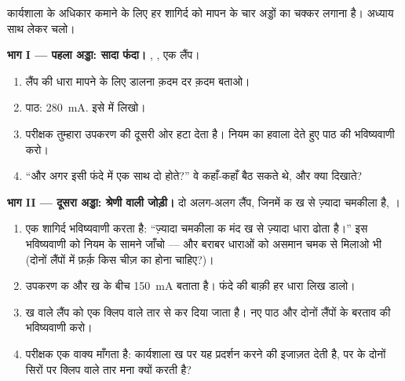 \begin{problem}[{सप्ताहांत समस्या --- इलेक्ट्रॉनिकी कार्यशाला में
योग्यता का दिन; चार अड्डे, हर एक पर एक ऐमीटर; शागिर्द का
लाइसेंस}]\label{pb:g8:intensity-ammeter:1}
कार्यशाला के अधिकार कमाने के लिए हर शागिर्द को मापन के चार अड्डों का
चक्कर लगाना है। अध्याय साथ लेकर चलो।

\medskip\noindent\textbf{भाग I --- पहला अड्डा: सादा फंदा।}
, , एक लैंप।
\begin{enumerate}
  \item लैंप की धारा मापने के लिए  डालना क़दम दर क़दम बताओ।
  \item पाठ: \qty{280}{mA}. इसे  में लिखो।
  \item परीक्षक तुम्हारा उपकरण  की दूसरी ओर हटा देता है। नियम का
        हवाला देते हुए पाठ की भविष्यवाणी करो।
  \item ``और अगर इसी फंदे में एक साथ दो  होते?'' वे कहाँ-कहाँ
        बैठ सकते थे, और क्या दिखाते?
\end{enumerate}

\medskip\noindent\textbf{भाग II --- दूसरा अड्डा: श्रेणी वाली जोड़ी।}
दो अलग-अलग लैंप, जिनमें क ख से ज़्यादा चमकीला है, ।
\begin{enumerate}[resume]
  \item एक शागिर्द भविष्यवाणी करता है: ``ज़्यादा चमकीला क मंद ख से
        ज़्यादा धारा ढोता है।'' इस भविष्यवाणी को नियम के सामने जाँचो
        --- और बराबर धाराओं को असमान चमक से मिलाओ भी (दोनों लैंपों में
        फ़र्क़ किस चीज़ का होना चाहिए?)।
  \item उपकरण क और ख के बीच \qty{150}{mA} बताता है। फंदे की बाक़ी हर
        धारा लिख डालो।
  \item ख वाले लैंप को एक क्लिप वाले तार से  कर दिया जाता है।
        नए पाठ और दोनों लैंपों के बरताव की भविष्यवाणी करो।
  \item परीक्षक एक वाक्य माँगता है: कार्यशाला ख पर यह प्रदर्शन करने
        की इजाज़त देती है, पर \emph{} के दोनों सिरों पर क्लिप
        वाले तार मना क्यों करती है?
\end{enumerate}


\end{problem}
